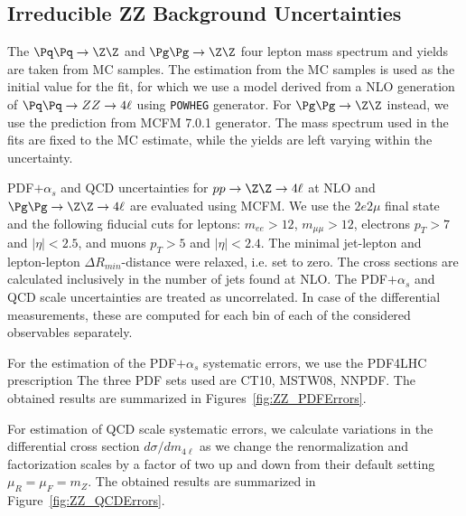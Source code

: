 \subsection{Irreducible ZZ Background Uncertainties}
\label{sec:totalZZXSecSyst}

The $\Pq\Pq\to \Z\Z$ and $\Pg\Pg\to \Z\Z$ four lepton mass spectrum and yields are
taken from MC samples. The estimation from the MC samples is used as the initial value for the fit, for which we
use a model derived from a NLO generation of $\Pq\Pq\to ZZ\to 4\ell$ using
{\tt POWHEG} generator. For $\Pg\Pg\to \Z\Z$ instead,  we use the prediction from {\sc MCFM 7.0.1} generator.
The mass spectrum used in the fits are fixed to the MC estimate, while the yields are left varying within the uncertainty.
\par
PDF$+\alpha_s$ and QCD uncertainties for $pp \to \Z\Z \to 4\ell$ at NLO
and $\Pg\Pg \to \Z\Z \to 4\ell$ are evaluated using MCFM. We use
the $2e2\mu$ final state and the following fiducial cuts for leptons:
$m_{ee}>12$, $m_{\mu\mu}>12$, electrons $p_T>7$ and $|\eta|<2.5$, and
muons $p_T>5$ and $|\eta|<2.4$.  The minimal jet-lepton and
lepton-lepton $\Delta R_{min}$-distance were relaxed, i.e. set to
zero. The cross sections are calculated inclusively in the number of
jets found at NLO. The PDF$+\alpha_s$ and QCD scale uncertainties are treated as uncorrelated.
In case of the differential measurements, these are computed for each bin of each of the considered
observables separately.
\par
For the estimation of the PDF$+\alpha_s$ systematic errors, we use the
PDF4LHC prescription The three PDF sets used are
CT10, MSTW08, NNPDF.  The obtained results are summarized in Figures~\ref{fig:ZZ_PDFErrors}.
\par
For estimation of QCD scale systematic errors, we calculate variations
in the differential cross section $d \sigma / dm_{4\ell}$ as we change
the renormalization and factorization scales by a factor of two up and
down from their default setting $\mu_R = \mu_F = m_Z $.  The obtained
results are summarized in Figure~\ref{fig:ZZ_QCDErrors}.

